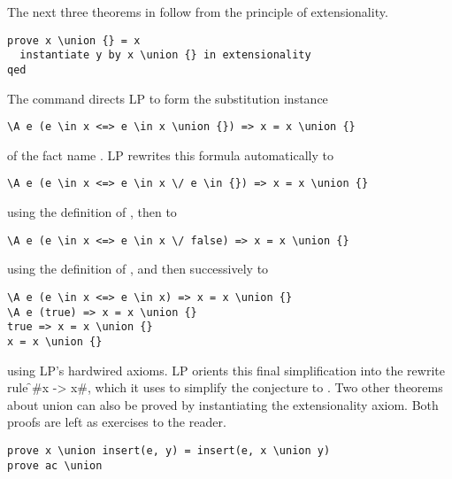 
The next three theorems in  follow from the principle
of extensionality.
\begin{verbatim}
prove x \union {} = x
  instantiate y by x \union {} in extensionality
qed
\end{verbatim}

The  command directs LP to form the substitution instance
\begin{verbatim}
\A e (e \in x <=> e \in x \union {}) => x = x \union {}
\end{verbatim}
of the fact name .  LP rewrites this formula automatically
to 
\begin{verbatim}
\A e (e \in x <=> e \in x \/ e \in {}) => x = x \union {}
\end{verbatim}
using the definition of \fq{\union}, then to
\begin{verbatim}
\A e (e \in x <=> e \in x \/ false) => x = x \union {}
\end{verbatim}
using the definition of \fq{\in}, and then successively to
\begin{verbatim}
\A e (e \in x <=> e \in x) => x = x \union {}
\A e (true) => x = x \union {}
true => x = x \union {}
x = x \union {}
\end{verbatim}
using LP's hardwired axioms.  LP orients this final simplification into the
rewrite rule \f#x \union {} -> x#, which it uses to simplify the conjecture to
.
\p
Two other theorems about union can also be proved by instantiating the
extensionality axiom.  Both proofs are left as exercises to the reader.

\begin{verbatim}
prove x \union insert(e, y) = insert(e, x \union y)
prove ac \union
\end{verbatim}
